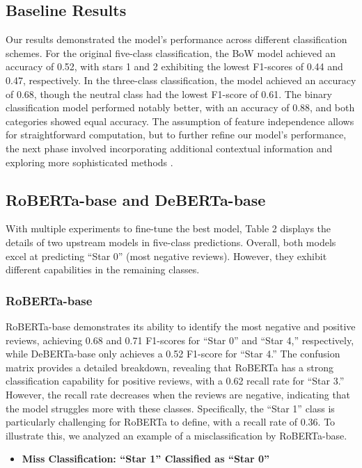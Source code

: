 \documentclass[11pt]{article}
\begin{document}
\subsection{Baseline Results}
Our results demonstrated the model’s performance across different classification schemes. For the original five-class classification, the BoW model achieved an accuracy of 0.52, with stars 1 and 2 exhibiting the lowest F1-scores of 0.44 and 0.47, respectively. In the three-class classification, the model achieved an accuracy of 0.68, though the neutral class had the lowest F1-score of 0.61. The binary classification model performed notably better, with an accuracy of 0.88, and both categories showed equal accuracy. The assumption of feature independence allows for straightforward computation, but to further refine our model's performance, the next phase involved incorporating additional contextual information and exploring more sophisticated methods \citep{rish2001empirical}.

\subsection{RoBERTa-base and DeBERTa-base}
With multiple experiments to fine-tune the best model, Table 2 displays the details of two upstream models in five-class predictions. Overall, both models excel at predicting “Star 0” (most negative reviews). However, they exhibit different capabilities in the remaining classes.

\subsubsection{RoBERTa-base}
RoBERTa-base demonstrates its ability to identify the most negative and positive reviews, achieving 0.68 and 0.71  F1-scores for “Star 0” and “Star 4,” respectively, while DeBERTa-base only achieves a 0.52 F1-score for “Star 4.” The confusion matrix provides a detailed breakdown, revealing that RoBERTa has a strong classification capability for positive reviews, with a 0.62 recall rate for “Star 3.” However, the recall rate decreases when the reviews are negative, indicating that the model struggles more with these classes. Specifically, the “Star 1” class is particularly challenging for RoBERTa to define, with a recall rate of 0.36. To illustrate this, we analyzed an example of a misclassification by RoBERTa-base.

\begin{itemize}
  \item \textbf{Miss Classification: ``Star 1'' Classified as ``Star 0''}
\end{itemize}
\end{document}
